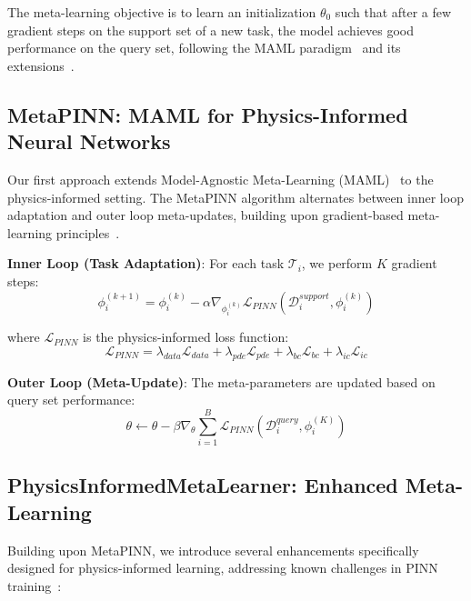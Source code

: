 \documentclass[review]{elsarticle}
\begin{document}
The meta-learning objective is to learn an initialization $\theta_0$ such that after a few gradient steps on the support set of a new task, the model achieves good performance on the query set, following the MAML paradigm~\cite{finn2017model} and its extensions~\cite{li2017meta,rajeswaran2019meta}.

\subsection{MetaPINN: MAML for Physics-Informed Neural Networks}

Our first approach extends Model-Agnostic Meta-Learning (MAML)~\cite{finn2017model} to the physics-informed setting. The MetaPINN algorithm alternates between inner loop adaptation and outer loop meta-updates, building upon gradient-based meta-learning principles~\cite{nichol2018first,antoniou2018train}.

\textbf{Inner Loop (Task Adaptation)}: For each task $\mathcal{T}_i$, we perform $K$ gradient steps:
\begin{equation}
\phi_i^{(k+1)} = \phi_i^{(k)} - \alpha \nabla_{\phi_i^{(k)}} \mathcal{L}_{PINN}(\mathcal{D}_i^{support}, \phi_i^{(k)})
\end{equation}

where $\mathcal{L}_{PINN}$ is the physics-informed loss function:
\begin{equation}
\mathcal{L}_{PINN} = \lambda_{data} \mathcal{L}_{data} + \lambda_{pde} \mathcal{L}_{pde} + \lambda_{bc} \mathcal{L}_{bc} + \lambda_{ic} \mathcal{L}_{ic}
\end{equation}

\textbf{Outer Loop (Meta-Update)}: The meta-parameters are updated based on query set performance:
\begin{equation}
\theta \leftarrow \theta - \beta \nabla_\theta \sum_{i=1}^{B} \mathcal{L}_{PINN}(\mathcal{D}_i^{query}, \phi_i^{(K)})
\end{equation}

\subsection{PhysicsInformedMetaLearner: Enhanced Meta-Learning}

Building upon MetaPINN, we introduce several enhancements specifically designed for physics-informed learning, addressing known challenges in PINN training~\cite{wang2021understanding,wang2022when,krishnapriyan2021characterizing}:
\end{document}

